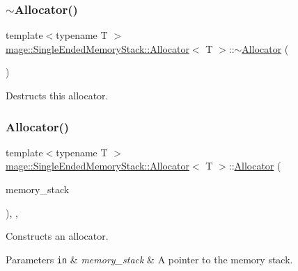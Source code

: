 \subsubsection{\texorpdfstring{$\sim$\+Allocator()}{~Allocator()}}
{\footnotesize\ttfamily template$<$typename T $>$ \\
\mbox{\hyperlink{classmage_1_1_single_ended_memory_stack_1_1_allocator}{mage\+::\+Single\+Ended\+Memory\+Stack\+::\+Allocator}}$<$ T $>$\+::$\sim$\mbox{\hyperlink{classmage_1_1_single_ended_memory_stack_1_1_allocator}{Allocator}} (\begin{DoxyParamCaption}{ }\end{DoxyParamCaption})\hspace{0.3cm}{\ttfamily [default]}}

Destructs this allocator. \mbox{\label{classmage_1_1_single_ended_memory_stack_1_1_allocator_a8c82486b5fa67f596738805aa73559d9}} 
\subsubsection{\texorpdfstring{Allocator()}{Allocator()}\hspace{0.1cm}{\footnotesize\ttfamily [4/4]}}
{\footnotesize\ttfamily template$<$typename T $>$ \\
\mbox{\hyperlink{classmage_1_1_single_ended_memory_stack_1_1_allocator}{mage\+::\+Single\+Ended\+Memory\+Stack\+::\+Allocator}}$<$ T $>$\+::\mbox{\hyperlink{classmage_1_1_single_ended_memory_stack_1_1_allocator}{Allocator}} (\begin{DoxyParamCaption}\item[{\mbox{\hyperlink{namespacemage_a8769f9d670d6b585ea306cb1062af94b}{Not\+Null}}$<$ \mbox{\hyperlink{classmage_1_1_single_ended_memory_stack}{Single\+Ended\+Memory\+Stack}} $\ast$ $>$}]{memory\+\_\+stack }\end{DoxyParamCaption})\hspace{0.3cm}{\ttfamily [explicit]}, {\ttfamily [private]}, {\ttfamily [noexcept]}}

Constructs an allocator.


\begin{DoxyParams}[1]{Parameters}
\mbox{\tt in}  & {\em memory\+\_\+stack} & A pointer to the memory stack. \\
\hline
\end{DoxyParams}


